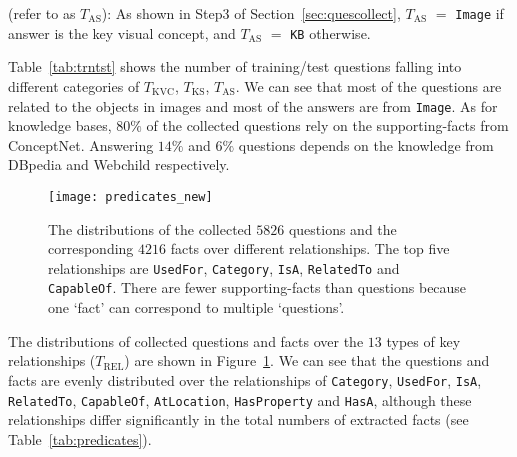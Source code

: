 \documentclass[10pt,journal]{IEEEtran}
\def\bluett{}
\begin{document}
{\noindent \bluett{\bf $-$ Answer Source} \bluett{(refer to as \texttt{$T_{\mbox{AS}}$}):
As shown in Step3 of Section~\ref{sec:quescollect}, 
\texttt{$T_{\mbox{AS}}$} $=$ \texttt{Image} if answer is the key visual concept, 
and \texttt{$T_{\mbox{AS}}$} $=$ \texttt{KB} otherwise.}


Table~\ref{tab:trntst} shows the number of training/test questions falling into different categories of 
\texttt{$T_{\mbox{KVC}}$}, \texttt{$T_{\mbox{KS}}$}, \texttt{$T_{\mbox{AS}}$}.
We can see that most of the questions are related to the objects in images and most of the answers are from 
\texttt{Image}.
As for knowledge bases, $80\%$ of the collected questions rely on the supporting-facts from ConceptNet.
Answering $14\%$ and $6\%$ questions depends on the knowledge from DBpedia and Webchild respectively.




\begin{figure}[tbp!]
\begin{center}
	\texttt{[image: predicates\_new]}
\end{center}
\vspace{-5pt}
\caption{The distributions of the collected $5826$ questions and the corresponding $4216$ facts over different relationships.
The top five relationships are \texttt{UsedFor}, \texttt{Category}, \texttt{IsA}, \texttt{RelatedTo} and \texttt{CapableOf}. There are fewer supporting-facts than questions because one `fact' can correspond to multiple `questions'.}
\label{fig:predicates}
\end{figure}

The distributions of collected questions and facts over the $13$ types of key relationships (\texttt{$T_{\mbox{REL}}$}) are shown in Figure~\ref{fig:predicates}. 
We can see that the questions and facts are evenly distributed over the relationships of
\texttt{Category}, \texttt{UsedFor}, \texttt{IsA}, \texttt{RelatedTo}, \texttt{CapableOf},
\texttt{AtLocation}, \texttt{HasProperty} and \texttt{HasA},
although these relationships differ significantly in the total numbers of extracted facts (see Table~\ref{tab:predicates}).


}
\end{document}
